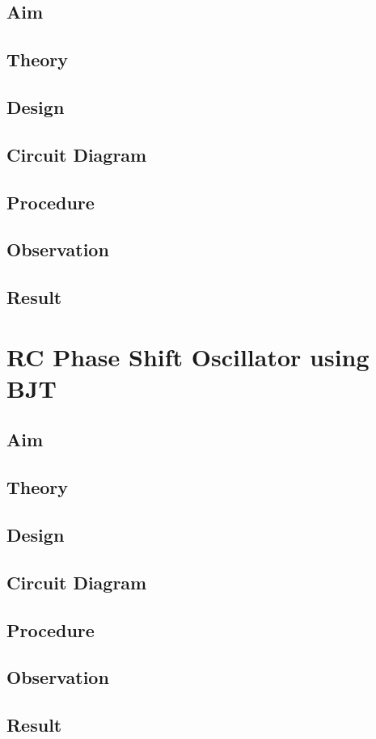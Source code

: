 \documentclass{book}
\begin{document}
\section*{Aim}
\section*{Theory}
\section*{Design}
\section*{Circuit Diagram}
\section*{Procedure}
\section*{Observation}
\section*{Result}
\chapter[RC Phase Shift Oscillator using BJT]{RC Phase Shift Oscillator using BJT}
\section*{Aim}
\section*{Theory}
\section*{Design}
\section*{Circuit Diagram}
\section*{Procedure}
\section*{Observation}
\section*{Result}
\end{document}
